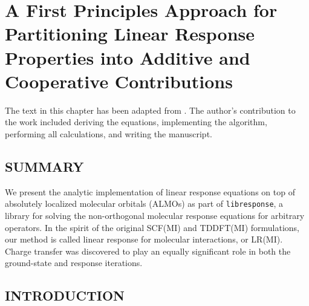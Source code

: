 \documentclass[%
  class = book,%
  crop = false,%
  float = true,%
  multi = true,%
  preview = false,%
]{standalone}
\newcommand{\caps}[1]{\uppercase{#1}}
\begin{document}
\chapter[ALMO Linear Response]{A First Principles Approach for Partitioning Linear Response Properties into Additive and Cooperative Contributions}
\label{ch:paper_04}

The text in this chapter has been adapted from . The author's contribution to the work included deriving the equations, implementing the algorithm, performing all calculations, and writing the manuscript.

\newcommand{\aud}{\si{\bohr\cubed}}
\newcommand{\geomdeftsvp}{\SI{2.4106}{\angstrom}}
\newcommand{\geomdeftsvpd}{\SI{2.4297}{\angstrom}}

\newcommand{\pdalton}{\textsc{Dalton}}
\newcommand{\libresponse}{\texttt{libresponse}}
\newcommand{\psif}{\textsc{Psi4}}
\newcommand{\response}{\textsc{Response}}
\newcommand{\op}[1]{\ensuremath{\hat{#1}}}
\newcommand{\mat}[1]{\ensuremath{\mathbf{#1}}}
\newcommand{\Order}[1]{\ensuremath{\mathcal{O}\left(#1\right)}}
\newcommand{\tr}[1]{\ensuremath{{\mathrm{Tr}}\left\{#1\right\}}}
\newcommand{\eq}[1]{eq.~(\ref{#1})}
\newcommand{\citen}[1]{ref.~\parencite{#1}}
\newcommand{\lr}[2]{\braket{\braket{\op{#1}; \op{#2}}}}
\newcommand{\lrs}[4]{\braket{\braket{\op{#1}_{#2}; \op{#3}_{#4}}}}

\section{\texorpdfstring{\caps{Summary}}{Summary}}

We present the analytic implementation of linear response equations on top of absolutely localized molecular orbitals (ALMOs) as part of \libresponse{}, a library for solving the non-orthogonal molecular response equations for arbitrary operators. In the spirit of the original SCF(MI) and TDDFT(MI) formulations, our method is called linear response for molecular interactions, or LR(MI). Charge transfer was discovered to play an equally significant role in both the ground-state and response iterations.

\section{\texorpdfstring{\caps{Introduction}}{Introduction}}
\label{sec:introduction}
\end{document}
